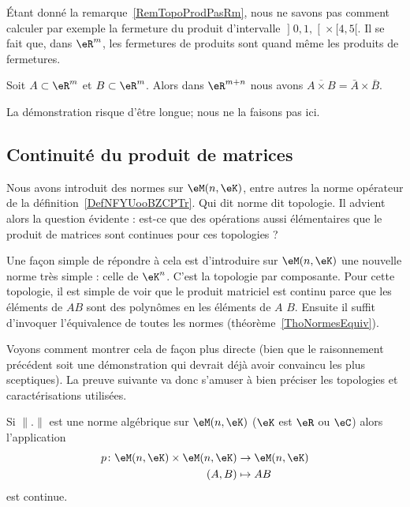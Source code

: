 Étant donné la remarque~\ref{RemTopoProdPasRm}, nous ne savons pas comment calculer par exemple la fermeture du produit d'intervalle $\mathopen] 0,1 ,  \mathclose[\times\mathopen[ 4 , 5 [$. Il se fait que, dans $\eR^m$, les fermetures de produits sont quand même les produits de fermetures.

\begin{proposition}		\label{PropovlAxBbarAbraB}
	Soit $A\subset\eR^m$ et $B\subset\eR^m$. Alors dans $\eR^{m+n}$ nous avons $\overline{ A\times B }=\bar A\times \bar B$.
\end{proposition}

La démonstration risque d'être longue; nous ne la faisons pas ici.

\subsection{Continuité du produit de matrices}
\label{SUBSECooOAWAooFcyUfI}

Nous avons introduit des normes sur \( \eM(n,\eK)\), entre autres la norme opérateur de la définition~\ref{DefNFYUooBZCPTr}. Qui dit norme dit topologie. Il advient alors la question évidente : est-ce que des opérations aussi élémentaires que le produit de matrices sont continues pour ces topologies ?

Une façon simple de répondre à cela est d'introduire sur \( \eM(n,\eK)\) une nouvelle norme très simple : celle de \( \eK^n\). C'est la topologie par composante. Pour cette topologie, il est simple de voir que le produit matriciel est continu parce que les éléments de \( AB\) sont des polynômes en les éléments de \( A\) \( B\). Ensuite il suffit d'invoquer l'équivalence de toutes les normes (théorème~\ref{ThoNormesEquiv}).

Voyons comment montrer cela de façon plus directe (bien que le raisonnement précédent soit une démonstration qui devrait déjà avoir convaincu les plus sceptiques). La preuve suivante va donc s'amuser à bien préciser les topologies et caractérisations utilisées.

\begin{lemma}
    Si \( \| . \|\) est une norme algébrique sur \( \eM(n,\eK)\) (\( \eK\) est \( \eR\) ou \( \eC\)) alors l'application
    \begin{equation}
        \begin{aligned}
            p\colon \eM(n,\eK)\times \eM(n,\eK)&\to \eM(n,\eK) \\
            (A,B)&\mapsto AB
        \end{aligned}
    \end{equation}
    est continue.
\end{lemma}

